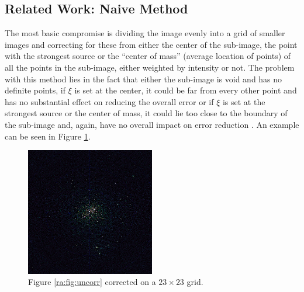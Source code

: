 \subsection{Related Work: Naive Method}
The most basic compromise is dividing the image evenly into a grid of smaller images and correcting for these from either the center of the sub-image, the point with the strongest source or the ``center of mass'' (average location of points) of all the points in the sub-image, either weighted by intensity or not. The problem with this method lies in the fact that either the sub-image is void and has no definite points, if $\xi$ is set at the center, it could be far from every other point and has no substantial effect on reducing the overall error or if $\xi$ is set at the strongest source or the center of mass, it could lie too close to the boundary of the sub-image and, again, have no overall impact on error reduction \citep{tasse2016tessellation}. An example can be seen in Figure \ref{ra:fig:cor23}.
%
\begin{figure}[H]
	\centering
	\includegraphics[width=0.5\textwidth]{Images/corrected-23x23.png}
	\caption{Figure \ref{ra:fig:uncorr} corrected on a $23\times23$ grid.}
	\label{ra:fig:cor23}
\end{figure}



